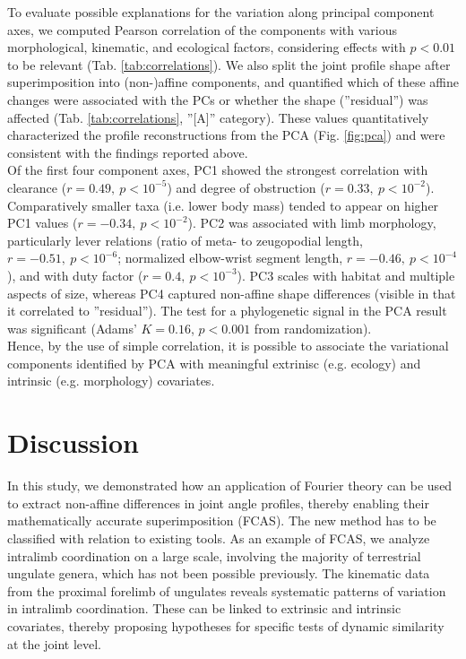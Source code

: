\documentclass[10pt, a4paper]{article}
\begin{document}
To evaluate possible explanations for the variation along principal component axes, we computed Pearson correlation of the components with various morphological, kinematic, and ecological factors, considering effects with $p<0.01$ to be relevant (Tab. \ref{tab:correlations}). 
We also split the joint profile shape after superimposition into (non-)affine components, and quantified which of these affine changes were associated with the PCs or whether the shape (''residual'') was affected (Tab. \ref{tab:correlations}, ''[A]'' category). 
These values quantitatively characterized the profile reconstructions from the PCA (Fig. \ref{fig:pca}) and were consistent with the findings reported above. 
\\Of the first four component axes, PC1 showed the strongest correlation with clearance ($r = 0.49,\ p < 10^{-5}$) and degree of obstruction ($r = 0.33,\ p < 10^{-2}$). 
Comparatively smaller taxa (i.e. lower body mass) tended to appear on higher PC1 values ($r = -0.34,\ p < 10^{-2}$). 
PC2 was associated with limb morphology, particularly lever relations (ratio of meta- to zeugopodial length, $r = -0.51,\ p < 10^{-6}$; normalized elbow-wrist segment length, $r = -0.46,\ p < 10^{-4}$), and with duty factor ($r = 0.4,\ p < 10^{-3}$). 
PC3 scales with habitat and multiple aspects of size, whereas PC4 captured non-affine shape differences (visible in that it correlated to ''residual''). 
The test for a phylogenetic signal in the PCA result was significant (Adams' $K=0.16$, $p < 0.001$ from randomization). 
\\Hence, by the use of simple correlation, it is possible to associate the variational components identified by PCA with meaningful extrinisc (e.g. ecology) and intrinsic (e.g. morphology) covariates. 




\FloatBarrier\pagebreak
\section{Discussion}
In this study, we demonstrated how an application of Fourier theory can be used to extract non-affine differences in joint angle profiles, thereby enabling their mathematically accurate superimposition (FCAS).
The new method has to be classified with relation to existing tools. 
As an example of FCAS, we analyze intralimb coordination on a large scale, involving the majority of terrestrial ungulate genera, which has not been possible previously.  
The kinematic data from the proximal forelimb of ungulates reveals systematic patterns of variation in intralimb coordination. 
These can be linked to extrinsic and intrinsic covariates, thereby proposing hypotheses for specific tests of dynamic similarity at the joint level. 
\end{document}
